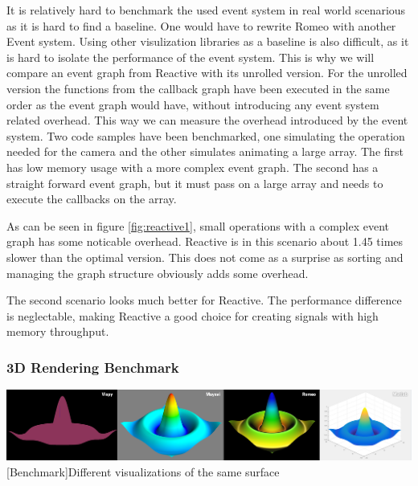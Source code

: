 It is relatively hard to benchmark the used event system in real world scenarious as it is hard to find a baseline.
One would have to rewrite Romeo with another Event system. Using other visulization libraries as a baseline is also difficult, as it is hard to isolate the performance of the event system.
This is why we will compare an event graph from Reactive with its unrolled version.
For the unrolled version the functions from the callback graph have been executed in the same order as the event graph would have, without introducing any event system related overhead.
This way we can measure the overhead introduced by the event system.
Two code samples have been benchmarked, one simulating the operation needed for the camera and the other simulates animating a large array.
The first has low memory usage with a more complex event graph. The second has a straight forward event graph, but it must pass on a large array and needs to execute the callbacks on the array.




As can be seen in figure \ref{fig:reactive1}, small operations with a complex event graph has some noticable overhead. Reactive is in this scenario about 1.45 times slower than the optimal version.
This does not come as a surprise as sorting and managing the graph structure obviously adds some overhead.

The second scenario looks much better for Reactive. The performance difference is neglectable, making Reactive a good choice for creating signals with high memory throughput.

\subsubsection{3D Rendering Benchmark}

\begin{minipage}{\linewidth}
    \centering
    \includegraphics[width=\linewidth]{graphics/vispy_mayavi_romeo.jpg}
    [Benchmark]{Different visualizations of the same surface}
    \label{fig:reactive1}
\end{minipage}

